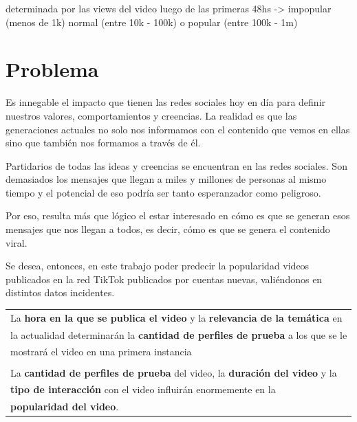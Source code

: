 \documentclass{article}
\begin{document}
determinada por las views del video luego de las primeras 48hs -> impopular (menos de 1k) normal (entre 10k - 100k) o popular (entre 100k - 1m)

\section{Problema}

Es innegable el impacto que tienen las redes sociales hoy en día para definir nuestros valores, 
comportamientos y creencias. La realidad es que las generaciones actuales no solo nos informamos
con el contenido que vemos en ellas sino que también nos formamos a través de él.

Partidarios de todas las ideas y creencias se encuentran en las redes sociales. Son demasiados
los mensajes que llegan a miles y millones de personas al mismo tiempo y el potencial de eso
podría ser tanto esperanzador como peligroso. 

Por eso, resulta más que lógico el estar interesado en cómo es que se generan esos mensajes que 
nos llegan a todos, es decir, cómo es que se genera el contenido viral.

Se desea, entonces, en este trabajo poder predecir la popularidad videos publicados en la red TikTok
publicados por cuentas nuevas, 
valiéndonos en distintos datos incidentes. 




\begin{center}
	\begin{tabular}{|l}
	La \textbf{hora en la que se publica el video} y la \textbf{relevancia de la temática} en \\
	la actualidad determinarán la \textbf{cantidad de perfiles de prueba} a los que se le \\
	mostrará el video en una primera instancia\\\\

	La \textbf{cantidad de perfiles de prueba} del video, la \textbf{duración del video} y la \\
	\textbf{tipo de interacción} con el video influirán enormemente en la \\ \textbf{popularidad del video}.
	\end{tabular}
\end{center}
\end{document}
